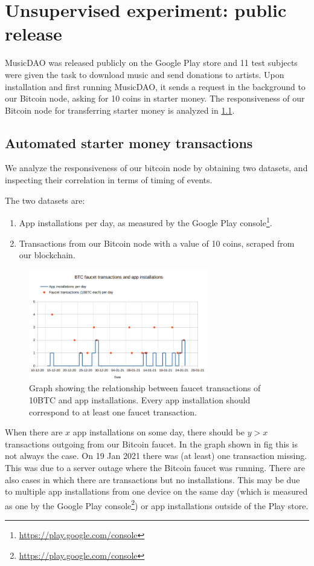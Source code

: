 \section{Unsupervised experiment: public release}
MusicDAO was released publicly on the Google Play store and 11 test subjects were given the task to download music and send donations to artists. Upon installation and first running MusicDAO, it sends a request in the background to our Bitcoin node, asking for 10 coins in starter money. The responsiveness of our Bitcoin node for transferring starter money is analyzed in \ref{chap:starter-money-flow}.

\subsection{Automated starter money transactions}
\label{chap:starter-money-flow}
We analyze the responsiveness of our bitcoin node by obtaining two datasets, and inspecting their correlation in terms of timing of events.

The two datasets are: 
\begin{enumerate}
    \item App installations per day, as measured by the Google Play console\footnote{\url{https://play.google.com/console}}.
    \item Transactions from our Bitcoin node with a value of 10 coins, scraped from our blockchain.
\end{enumerate}

\begin{figure}
    \centering
    \includegraphics[width=0.7\textwidth]{evaluation/faucet-app-installs.png}
    \caption{Graph showing the relationship between faucet transactions of 10BTC and app installations. Every app installation should correspond to at least one faucet transaction.}
    \label{fig:faucet-app-installs}
\end{figure}
When there are $x$ app installations on some day, there should be $y \gt x$ transactions outgoing from our Bitcoin faucet. In the graph shown in fig this is not always the case. On 19 Jan 2021 there was (at least) one transaction missing. This was due to a server outage where the Bitcoin faucet was running. There are also cases in which there are transactions but no installations. This may be due to multiple app installations from one device on the same day (which is measured as one by the Google Play console\footnote{\url{https://play.google.com/console}}) or app installations outside of the Play store.

